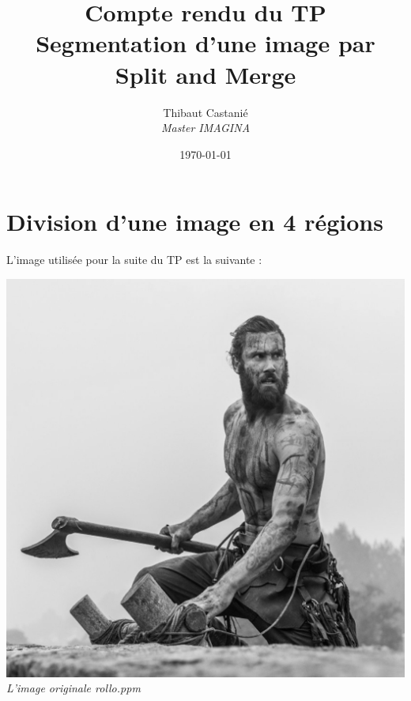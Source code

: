 \documentclass[a4paper,11pt]{article}
\begin{document}
\title{\textbf{Compte rendu du TP }\\Segmentation d’une image par Split and Merge}
\author{Thibaut Castanié\\\textit{Master IMAGINA}}
\date{\today}

\maketitle
\thispagestyle{empty}

\newpage 
\section{Division d'une image en 4 régions}
L'image utilisée pour la suite du TP est la suivante :
\begin{center}
\includegraphics[scale=0.6]{rollo.png}\\
\textit{L'image originale rollo.ppm}
\end{center}
\end{document}
